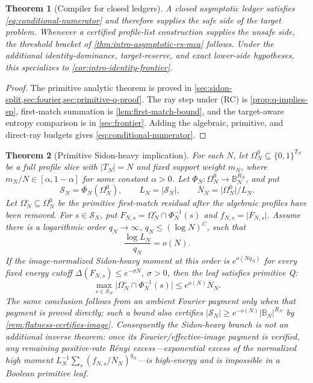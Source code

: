 \documentclass[12pt,a4paper]{amsart}
\numberwithin{equation}{section}
\newtheorem{theorem}{Theorem}[section]
\theoremstyle{remark}
\newcommand{\B}{\mathbb B}
\newcommand{\Omc}{\Omega^{\circ}}
\newcommand{\Scal}{\mathcal S}
\newcommand{\barN}{\overline N}
\newcommand{\Renyi}{R\'enyi}
\newcommand{\abs}[1]{\lvert #1\rvert}
\begin{document}
\begin{theorem}[Compiler for closed ledgers]\label{thm:main-ledger}
A closed asymptotic ledger satisfies \eqref{eq:conditional-numerator} and
therefore supplies the safe side of the target problem.  Whenever a
certified profile-list construction supplies the unsafe side, the threshold
bracket of \cref{thm:intro-asymptotic-rs-mca} follows.  Under the additional
identity-dominance, target-reserve, and exact lower-side hypotheses, this
specializes to \cref{cor:intro-identity-frontier}.
\end{theorem}

\begin{proof}
The primitive analytic theorem is proved in
\cref{sec:sidon-split,sec:fourier,sec:primitive-q-proof}.  The ray step under
\textup{(RC)} is \cref{prop:q-implies-sp}, first-match summation is
\cref{lem:first-match-bound}, and the target-aware entropy comparison is in
\cref{sec:frontier}.  Adding the algebraic, primitive, and direct-ray
budgets gives \eqref{eq:conditional-numerator}.
\end{proof}

\begin{theorem}[Primitive Sidon-heavy implication]
\label{thm:intro-sidon-heavy-repair}
For each \(N\), let \(\Omega_N^0\subseteq\{0,1\}^{T_N}\) be a
full profile slice with \(\abs{T_N}=N\) and fixed support weight \(m_N\),
where \(m_N/N\in[\alpha,1-\alpha]\) for some constant \(\alpha>0\).  Let
\(\Phi_N:\Omega_N^0\to\B_N^{R_N}\), and put
\[
 \Scal_N=\Phi_N(\Omega_N^0),\qquad L_N=\abs{\Scal_N},
 \qquad \barN_N=\abs{\Omega_N^0}/L_N.
\]
Let \(\Omc_N\subseteq\Omega_N^0\) be the primitive first-match residual
after the algebraic profiles have been removed.  For \(s\in\Scal_N\), put
\(F_{N,s}=\Omc_N\cap\Phi_N^{-1}(s)\) and
\(f_{N,s}=\abs{F_{N,s}}\).  Assume there is
a logarithmic order \(q_N\to\infty\), \(q_N\le(\log N)^C\), such that
\[
             \frac{\log L_N}{q_N}=o(N).
 \tag{1.9}\label{eq:intro-moment-accessibility}
\]
If the image-normalized Sidon-heavy moment at this order is
\(e^{o(Nq_N)}\) for every fixed energy cutoff
\(\Delta(F_{N,s})\le e^{-\sigma N}\), \(\sigma>0\), then the leaf satisfies
primitive Q:
\[
        \max_{s\in\Scal_N}\abs{\Omc_N\cap\Phi_N^{-1}(s)}
        \le e^{o(N)}\barN_N .
\]
The same conclusion follows from an ambient Fourier payment only when that
payment is proved directly; such a bound also certifies
\(\abs{\Scal_N}\ge e^{-o(N)}\abs{\B_N}^{R_N}\) by
\cref{rem:flatness-certifies-image}.
Consequently the Sidon-heavy branch is not an additional inverse theorem: once
its Fourier/effective-image payment is verified, any remaining positive-rate
\Renyi{} excess---exponential excess of the normalized high moment
\(L_N^{-1}\sum_s(f_{N,s}/\barN_N)^{q_N}\)---is high-energy and is impossible
in a Boolean primitive leaf.
\end{theorem}
\end{document}
